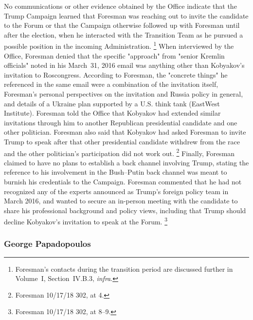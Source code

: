 No communications or other evidence obtained by the Office indicate that the Trump Campaign learned that Foresman was reaching out to invite the candidate to the Forum or that the Campaign otherwise followed up with Foresman until after the election, when he interacted with the Transition Team as he pursued a possible position in the incoming Administration.%
\footnote{Foresman's contacts during the transition period are discussed further in Volume~I, Section~IV.B.3, \textit{infra}.}
When interviewed by the Office, Foresman denied that the specific "approach" from "senior Kremlin officials" noted in his March~31, 2016 email was anything other than Kobyakov's invitation to Roscongress.
According to Foresman, the "concrete things" he referenced in the same email were a combination of the invitation itself, Foresman's personal perspectives on the invitation and Russia policy in general, and details of a Ukraine plan supported by a U.S. think tank (EastWest Institute).
Foresman told the Office that Kobyakov had extended similar invitations through him to another Republican presidential candidate and one other politician.
Foresman also said that Kobyakov had asked Foresman to invite Trump to speak after that other presidential candidate withdrew from the race and the other politician's participation did not work out.%
\footnote{Foresman 10/17/18 302, at 4.}
Finally, Foresman claimed to have no plans to establish a back channel involving Trump, stating the reference to his involvement in the Bush--Putin back channel was meant to burnish his credentials to the Campaign.
Foresman commented that he had not recognized any of the experts announced as Trump's foreign policy team in March 2016, and wanted to secure an in-person meeting with the candidate to share his professional background and policy views, including that Trump should decline Kobyakov's invitation to speak at the Forum.%
\footnote{Foresman 10/17/18 302, at 8--9.}

\subsubsection{George Papadopoulos}

